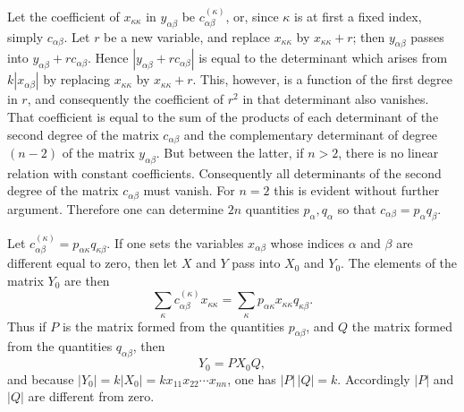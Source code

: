 \documentclass[11pt]{article}
\begin{document}
Let the coefficient of $x_{\kappa\kappa}$ in $y_{\alpha\beta}$ be $c_{\alpha\beta}^{(\kappa)}$, or, since $\kappa$ is at first a fixed index, simply $c_{\alpha\beta}$. Let $r$ be a new variable, and replace $x_{\kappa\kappa}$ by $x_{\kappa\kappa}+r$; then $y_{\alpha\beta}$ passes into $y_{\alpha\beta}+rc_{\alpha\beta}$. Hence $|y_{\alpha\beta}+rc_{\alpha\beta}|$ is equal to the determinant which arises from $k|x_{\alpha\beta}|$ by replacing $x_{\kappa\kappa}$ by $x_{\kappa\kappa}+r$. This, however, is a function of the first degree in $r$, and consequently the coefficient of $r^2$ in that determinant also vanishes. That coefficient is equal to the sum of the products of each determinant of the second degree of the matrix $c_{\alpha\beta}$ and the complementary determinant of degree $(n-2)$ of the matrix $y_{\alpha\beta}$. But between the latter, if $n>2$, there is no linear relation with constant coefficients. Consequently all determinants of the second degree of the matrix $c_{\alpha\beta}$ must vanish. For $n=2$ this is evident without further argument. Therefore one can determine $2n$ quantities $p_\alpha,q_\alpha$ so that $c_{\alpha\beta}=p_\alpha q_\beta$.

Let $c_{\alpha\beta}^{(\kappa)}=p_{\alpha\kappa}q_{\kappa\beta}$. If one sets the variables $x_{\alpha\beta}$ whose indices $\alpha$ and $\beta$ are different equal to zero, then let $X$ and $Y$ pass into $X_0$ and $Y_0$. The elements of the matrix $Y_0$ are then
\[
\sum_\kappa c_{\alpha\beta}^{(\kappa)}x_{\kappa\kappa}=\sum_\kappa p_{\alpha\kappa}x_{\kappa\kappa}q_{\kappa\beta}.
\]
Thus if $P$ is the matrix formed from the quantities $p_{\alpha\beta}$, and $Q$ the matrix formed from the quantities $q_{\alpha\beta}$, then
\[
Y_0=PX_0Q,
\]
and because $|Y_0|=k|X_0|=kx_{11}x_{22}\cdots x_{nn}$, one has $|P|\,|Q|=k$. Accordingly $|P|$ and $|Q|$ are different from zero.
\end{document}
